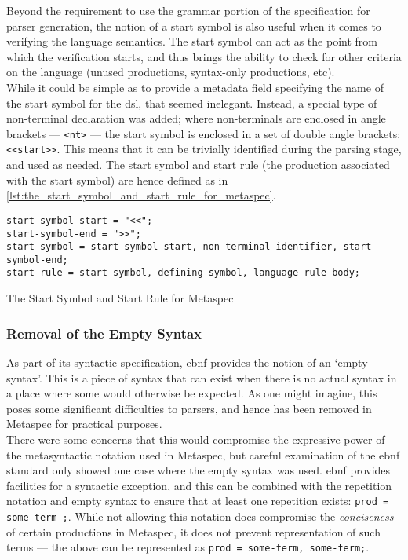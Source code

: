 Beyond the requirement to use the grammar portion of the specification for parser generation, the notion of a start symbol is also useful when it comes to verifying the language semantics.
The start symbol can act as the point from which the verification starts, and thus brings the ability to check for other criteria on the language (unused productions, syntax-only productions, etc). \\

While it could be simple as to provide a metadata field specifying the name of the start symbol for the \gls{dsl}, that seemed inelegant. 
Instead, a special type of non-terminal declaration was added; where non-terminals are enclosed in angle brackets --- \texttt{<nt>} --- the start symbol is enclosed in a set of double angle brackets: \texttt{<<start>>}. 
This means that it can be trivially identified during the parsing stage, and used as needed. 
The start symbol and start rule (the production associated with the start symbol) are hence defined as in \autoref{lst:the_start_symbol_and_start_rule_for_metaspec}.

\begin{listing}[!htb]
\begin{verbatim}
start-symbol-start = "<<";
start-symbol-end = ">>";
start-symbol = start-symbol-start, non-terminal-identifier, start-symbol-end;
start-rule = start-symbol, defining-symbol, language-rule-body;
\end{verbatim}
\caption{The Start Symbol and Start Rule for Metaspec}
\label{lst:the_start_symbol_and_start_rule_for_metaspec}
\end{listing}


\subsubsection{Removal of the Empty Syntax} %
\label{ssub:removal_of_the_empty_syntax}
As part of its syntactic specification, \gls{ebnf} provides the notion of an `empty syntax'.
This is a piece of syntax that can exist when there is no actual syntax in a place where some would otherwise be expected. 
As one might imagine, this poses some significant difficulties to parsers, and hence has been removed in Metaspec for practical purposes. \\

There were some concerns that this would compromise the expressive power of the metasyntactic notation used in Metaspec, but careful examination of the \gls{ebnf} standard only showed one case where the empty syntax was used. 
\gls{ebnf} provides facilities for a syntactic exception, and this can be combined with the repetition notation and empty syntax to ensure that at least one repetition exists: \texttt{prod = {some-term}-;}.
While not allowing this notation does compromise the \textit{conciseness} of certain productions in Metaspec, it does not prevent representation of such terms --- the above can be represented as \texttt{prod = some-term, {some-term};}.

